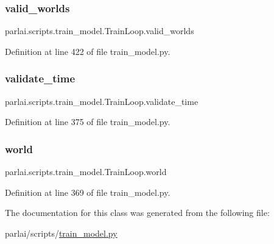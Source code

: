\subsubsection{\texorpdfstring{valid\+\_\+worlds}{valid\_worlds}}
{\footnotesize\ttfamily parlai.\+scripts.\+train\+\_\+model.\+Train\+Loop.\+valid\+\_\+worlds}



Definition at line 422 of file train\+\_\+model.\+py.

\mbox{\label{classparlai_1_1scripts_1_1train__model_1_1TrainLoop_ac7752245b67836fbcf9469a6247a14a2}} 
\subsubsection{\texorpdfstring{validate\+\_\+time}{validate\_time}}
{\footnotesize\ttfamily parlai.\+scripts.\+train\+\_\+model.\+Train\+Loop.\+validate\+\_\+time}



Definition at line 375 of file train\+\_\+model.\+py.

\mbox{\label{classparlai_1_1scripts_1_1train__model_1_1TrainLoop_aa22c430edd5956591bd0d266f0984ebb}} 
\subsubsection{\texorpdfstring{world}{world}}
{\footnotesize\ttfamily parlai.\+scripts.\+train\+\_\+model.\+Train\+Loop.\+world}



Definition at line 369 of file train\+\_\+model.\+py.



The documentation for this class was generated from the following file\+:\begin{DoxyCompactItemize}
\item 
parlai/scripts/\hyperlink{parlai_2scripts_2train__model_8py}{train\+\_\+model.\+py}\end{DoxyCompactItemize}
